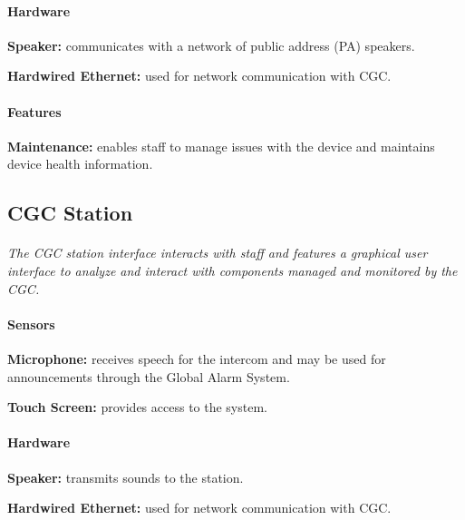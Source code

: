 \documentclass[12pt]{article}
\begin{document}
	\paragraph{Hardware}
	\begin{list}{}{}
		\item \textbf{Speaker:} communicates with a network of public address (PA) speakers.
		\item \textbf{Hardwired Ethernet:} used for network communication with CGC. 
	\end{list}
	
	\paragraph{Features}
	\begin{list}{}{}
		\item \textbf{Maintenance:} enables staff to manage issues with the device	and 
		maintains device health information.
	\end{list}


	\subsection{CGC Station}
	\paragraph{} \textit{The CGC station interface interacts with staff and features a 
	graphical user interface to analyze and interact with components managed and monitored
	by the CGC.}		
	
	\paragraph{Sensors}
	\begin{list}{}{}
		\item \textbf{Microphone:} receives speech for the intercom and may be used 
		for announcements through the Global Alarm System.
		\item \textbf{Touch Screen:} provides access to the system.
	\end{list}
		
	\paragraph{Hardware}
	\begin{list}{}{}
		\item \textbf{Speaker:} transmits sounds to the station.
		\item \textbf{Hardwired Ethernet:} used for network communication with CGC. 
	\end{list}
	
\end{document}

